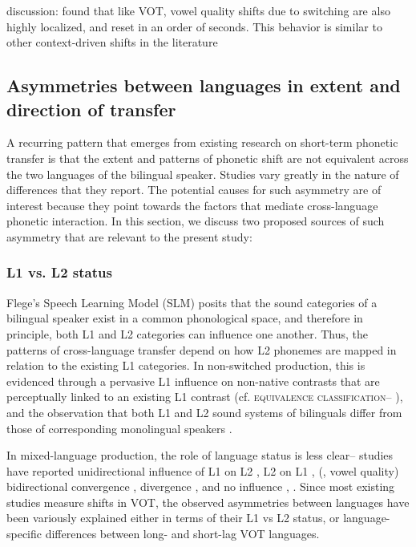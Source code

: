 \documentclass[12 pt]{article}
\begin{document}
\alert{discussion: found that like VOT, vowel quality shifts due to switching are also highly localized, and reset in an order of seconds. This behavior is similar to other context-driven shifts in the literature}

\subsection{Asymmetries between languages in extent and direction of transfer} \label{asymmetries}
A recurring pattern that emerges from existing research on short-term phonetic transfer is that the extent and patterns of phonetic shift are not equivalent across the two languages of the bilingual speaker. Studies vary greatly in the nature of differences that they report. The potential causes for such asymmetry are of interest because they point towards the factors that mediate cross-language phonetic interaction. In this section, we discuss two proposed sources of such asymmetry that are relevant to the present study: 

\subsubsection*{L1 vs. L2 status} 
Flege's Speech Learning Model (SLM) \citeyearpar{flege1995second,flege2007language} posits that the sound categories of a bilingual speaker exist in a common phonological space, and therefore in principle, both L1 and L2 categories can influence one another. Thus, the patterns of cross-language transfer depend on how L2 phonemes are mapped in relation to the existing L1 categories. In non-switched production, this is evidenced through a pervasive L1 influence on non-native contrasts that are perceptually linked to an existing L1 contrast (cf. \textsc{equivalence classification}-- \cite{flege1984limits,flege1987production}), and the observation that both L1 and L2 sound systems of bilinguals differ from those of corresponding monolingual speakers \citep[e.g.][vowel quality]{guion2003vowel}. 

In mixed-language production, the role of language status is less clear-- studies have reported unidirectional influence of L1 on L2 \citep[][VOT]{balukas2015spanish,antoniou2011inter,vsimavckova2015immediate,goldrick2014language}, L2 on L1 \citep[][VOT]{tsui2019impact, olson2013bilingual}, (\cite{elias2017effects}, vowel quality) bidirectional convergence \citep[][VOT]{bullock2009trying, olson2016role}, divergence \citep[][VOT]{bullock2009trying,vsimavckova2018patterns}, and no influence \citep[][vowel quality]{muldner2019phonetics}, \citep[][phonological process]{schwartz2015language}. Since most existing studies measure shifts in VOT, the observed asymmetries between languages have been variously explained either in terms of their L1 vs L2 status, or language-specific differences between long- and short-lag VOT languages. %
\end{document}
